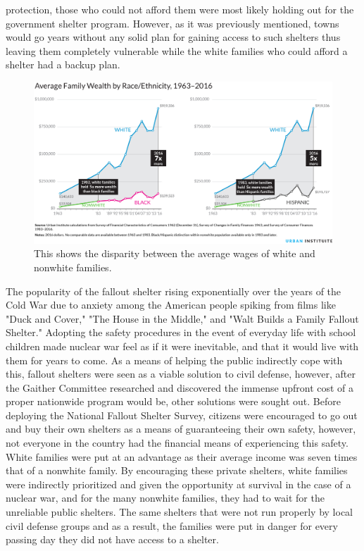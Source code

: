 \documentclass[12pt]{turabian-researchpaper}
\begin{document}
protection, those who could not afford them were most likely holding out for the government shelter program. However, as it was previously mentioned, towns would go years without any solid plan for gaining access to such shelters thus leaving them completely vulnerable while the white families who could afford a shelter had a backup plan.

\begin{figure}[!h]
    \centering
    \includegraphics[scale=0.6]{images/WealthByRace-avg.jpeg}
    \caption{This shows the disparity between the average wages of white and nonwhite families.}
    \label{WealthAvg}
\end{figure}



The popularity of the fallout shelter rising exponentially over the years of the Cold War due to anxiety among the American people spiking from films like "Duck and Cover," "The House in the Middle," and "Walt Builds a Family Fallout Shelter." Adopting the safety procedures in the event of everyday life with school children made nuclear war feel as if it were inevitable, and that it would live with them for years to come. As a means of helping the public indirectly cope with this, fallout shelters were seen as a viable solution to civil defense, however, after the Gaither Committee researched and discovered the immense upfront cost of a proper nationwide program would be, other solutions were sought out. Before deploying the National Fallout Shelter Survey, citizens were encouraged to go out and buy their own shelters as a means of guaranteeing their own safety, however, not everyone in the country had the financial means of experiencing this safety. White families were put at an advantage as their average income was seven times that of a nonwhite family. By encouraging these private shelters, white families were indirectly prioritized and given the opportunity at survival in the case of a nuclear war, and for the many nonwhite families, they had to wait for the unreliable public shelters. The same shelters that were not run properly by local civil defense groups and as a result, the families were put in danger for every passing day they did not have access to a shelter.
\end{document}
